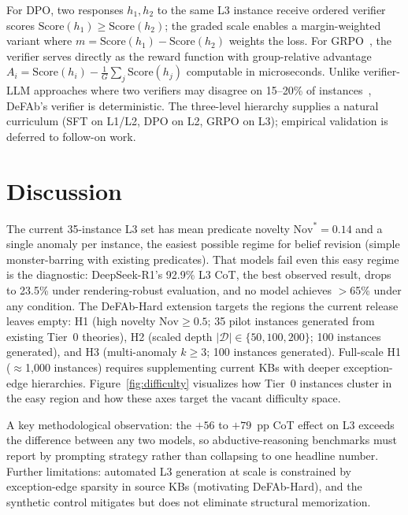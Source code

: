 \documentclass{article}
\theoremstyle{definition}
\newcommand{\D}{\mathcal{D}}
\newcommand{\Nov}{\mathrm{Nov}}
\newcommand{\Score}{\mathrm{Score}}
\begin{document}
For DPO, two responses $h_1, h_2$ to the same L3 instance receive ordered verifier scores $\Score(h_1) \geq \Score(h_2)$; the graded scale enables a margin-weighted variant where $m = \Score(h_1) - \Score(h_2)$ weights the loss. For GRPO~\citep{shao2024deepseekmath}, the verifier serves directly as the reward function with group-relative advantage $A_i = \Score(h_i) - \frac{1}{G}\sum_j \Score(h_j)$ computable in microseconds. Unlike verifier-LLM approaches where two verifiers may disagree on 15--20\% of instances~\citep{wen2025aimecot}, DeFAb's verifier is deterministic. The three-level hierarchy supplies a natural curriculum (SFT on L1/L2, DPO on L2, GRPO on L3); empirical validation is deferred to follow-on work.


\section{Discussion}\label{sec:discussion}

The current 35-instance L3 set has mean predicate novelty $\Nov^* = 0.14$ and a single anomaly per instance, the easiest possible regime for belief revision (simple monster-barring with existing predicates). That models fail even this easy regime is the diagnostic: DeepSeek-R1's 92.9\% L3 CoT, the best observed result, drops to 23.5\% under rendering-robust evaluation, and no model achieves $>$65\% under any condition. The DeFAb-Hard extension targets the regions the current release leaves empty: H1 (high novelty $\Nov \geq 0.5$; 35 pilot instances generated from existing Tier~0 theories), H2 (scaled depth $|\D| \in \{50, 100, 200\}$; 100 instances generated), and H3 (multi-anomaly $k \geq 3$; 100 instances generated). Full-scale H1 ($\approx$1{,}000 instances) requires supplementing current KBs with deeper exception-edge hierarchies. Figure~\ref{fig:difficulty} visualizes how Tier~0 instances cluster in the easy region and how these axes target the vacant difficulty space.

A key methodological observation: the $+56$ to $+79$~pp CoT effect on L3 exceeds the difference between any two models, so abductive-reasoning benchmarks must report by prompting strategy rather than collapsing to one headline number. Further limitations: automated L3 generation at scale is constrained by exception-edge sparsity in source KBs (motivating DeFAb-Hard), and the synthetic control mitigates but does not eliminate structural memorization.
\end{document}

